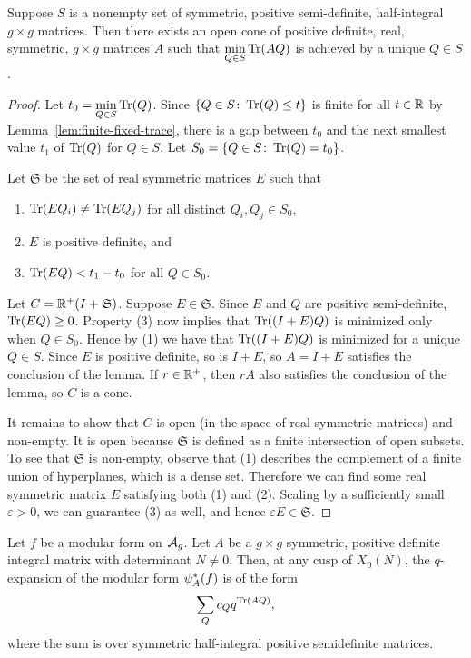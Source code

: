 \documentclass{amsart}
\begin{document}
\begin{lemma}\label{lem:unique-minimizer}
  Suppose $S$ is a nonempty set of symmetric, positive semi-definite, half-integral $g \times g$ matrices. Then there exists an open cone of positive definite, real, symmetric, $g \times g$ matrices $A$ such that $\displaystyle\min_{Q \in S}\operatorname{Tr}(AQ)$ is achieved by a unique $Q\in S$.
\end{lemma}
\begin{proof}
Let $t_0 = \displaystyle\min_{Q \in S}\operatorname{Tr}(Q)$.
  Since $\{Q \in S \colon \operatorname{Tr}(Q) \leq t\}$ is finite for all $t \in \mathbb{R}$ by Lemma~\ref{lem:finite-fixed-trace},
  there is a gap between $t_0$ and the next smallest value $t_1$ of $\operatorname{Tr}(Q)$ for $Q \in S$. Let $S_0 = \{Q \in S \colon \operatorname{Tr}(Q) = t_0\}$.

  Let $\mathfrak{S}$ be the set of real symmetric matrices $E$ such that
  \begin{enumerate}
    \item $\operatorname{Tr}(EQ_i) \neq \operatorname{Tr}(EQ_j)$ for all distinct $Q_i,Q_j \in S_0$,
    \item $E$ is positive definite, and
    \item $\operatorname{Tr}(EQ) < t_1 - t_0$ for all $Q\in S_0$.
  \end{enumerate}
  Let $C = \mathbb{R}^+(I + \mathfrak{S})$.
  Suppose $E\in\mathfrak{S}$. Since $E$ and $Q$ are positive semi-definite, $\operatorname{Tr}(EQ)\ge 0$. Property (3) now implies that $\operatorname{Tr}((I+E)Q)$ is minimized only when $Q \in S_0$. Hence by (1) we have that $\operatorname{Tr}((I+E)Q)$ is minimized for a unique $Q \in S$. Since $E$ is positive definite, so is $I+E$, so $A = I + E$ satisfies the conclusion of the lemma. If $r \in \mathbb{R}^+$, then $rA$ also satisfies the conclusion of the lemma,  so $C$ is a cone.

  It remains to show that $C$ is open (in the space of real symmetric matrices) and non-empty. It is open because $\mathfrak{S}$ is defined as a finite intersection of open subsets. To see that $\mathfrak{S}$ is non-empty, observe that (1) describes the complement of a finite union of hyperplanes, which is a dense set. Therefore we can find some real symmetric matrix $E$ satisfying both (1) and (2). Scaling by a sufficiently small $\varepsilon > 0$, we can guarantee (3) as well, and hence $\varepsilon E \in \mathfrak{S}$.
\end{proof}

\begin{lemma}\label{lemma:q-expansion}
  Let $f$ be a modular form on $\mathcal{A}_g$. Let $A$ be a $g \times g$ symmetric, positive definite integral matrix with determinant $N \neq 0$. Then, at any cusp of $X_0(N)$, the $q$-expansion of the modular form $\psi_{A}^*(f)$ is of the form
  \[
    \sum_Q c_Q q^{\operatorname{Tr}(AQ)},
  \]
  where the sum is over symmetric half-integral positive semidefinite matrices.
\end{lemma}
\end{document}
